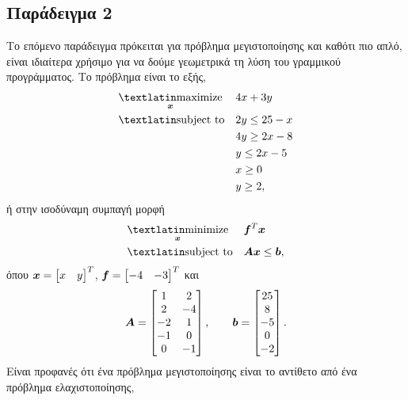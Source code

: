 \subsection{Παράδειγμα 2}
Το επόμενο παράδειγμα πρόκειται για πρόβλημα μεγιστοποίησης και καθότι πιο απλό,
είναι ιδιαίτερα χρήσιμο για να δούμε γεωμετρικά τη λύση του γραμμικού προγράμματος.
Το πρόβλημα είναι το εξής,
\begin{equation*}
    \begin{aligned}
        & \underset{\vc{x}}{\text{\tl{maximize}}} & & 4x + 3y \\
        & \text{\tl{subject to}} & & 2y \leq 25 - x \\
        &&& 4y \geq 2x - 8 \\
        &&& y \leq 2x - 5 \\
        &&& x \geq 0 \\
        &&& y \geq 2,
    \end{aligned}
\end{equation*}
ή στην ισοδύναμη συμπαγή μορφή
\begin{equation*}
    \begin{aligned}
        & \underset{\vc{x}}{\text{\tl{minimize}}} & & \vc{f}^T\vc{x} \\
        & \text{\tl{subject to}} & & \vc{A}\vc{x} \leq \vc{b},
    \end{aligned}
\end{equation*}
όπου $\bm{x} = \begin{bmatrix} x & y\end{bmatrix}^T$, $\bm{f} = \begin{bmatrix}-4 & -3\end{bmatrix}^T$ και
\begin{equation*}
    \boldsymbol{A} =
    \begin{bmatrix}
        1 & 2 \\
        2 & -4 \\
        -2 & 1 \\
        -1 & 0 \\
        0 & -1
    \end{bmatrix}, \qquad
    \bm{b} =
    \begin{bmatrix}
        25\\ 8\\ -5\\ 0\\ -2
    \end{bmatrix}.
\end{equation*}
Είναι προφανές ότι ένα πρόβλημα μεγιστοποίησης είναι το αντίθετο από ένα πρόβλημα ελαχιστοποίησης,
